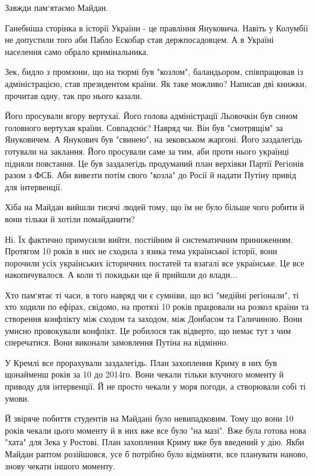 \begin{itemize}

Завжди пам`ятаємо Майдан.

Ганебніша сторінка в історії України - це правління Януковича. Навіть у
Колумбії не допустили того аби Пабло Ескобар став держпосадовцем. А в Україні
населення само обрало кримінальника.

Зек, бидло з промзони, що на тюрмі був "козлом", баландьором, співпрацював із
адміністрацією, став президентом країни. Як таке можливо? Написав дві книжки,
прочитав одну, так про нього казали.

Його просували вгору вертухаї. Його голова адміністрації Льовочкін був сином
головного вертухая країни. Совпадєніє? Навряд чи. Він був "смотрящім" за
Януковичем. А Янукович був "свинею", на зековськом жаргоні. Його заздалегідь
готували на заклання. Його просували саме за тим, аби проти нього українці
підняли повстання. Це був заздалегідь продуманий план верхівки Партії Регіонів
разом з ФСБ. Аби вивезти потім свого "козла" до Росії й надати Путіну привід
для інтервенції.

Хіба на Майдан вийшли тисячі людей тому, що їм не було більше чого робити й
вони тільки й хотіли помайданити?

Ні. Їх фактично примусили вийти, постійним й систематичним приниженням.
Протягом 10 років в них не сходила з язика тема української історії, вони
порочили усіх українських історичних постатей та взагалі все українське. Це все
накопичувалося. А коли ті покидьки ще й прийшли до влади...

Хто пам`ятає ті часи, в того навряд чи є сумніви, що всі "медійні регіонали",
ті хто ходили по ефірах, свідомо, на протязі 10 років працювали на розкол
країни та створення конфлікту між сходом та заходом, між Донбасом та Галичиною.
Вони умисно провокували конфлікт. Це робилося так відверто, що немає тут з чим
сперечатися. Вони виконали замовлення Путіна на відмінно.

У Кремлі все прорахували заздалегідь. План захоплення Криму в них був щонайменш
років за 10 до 2014го. Вони чекали тільки влучного моменту й приводу для
інтервенції. Й не просто чекали у моря погоди, а створювали собі ті умови.

Й звіряче побиття студентів на Майдані було невипадковим. Тому що вони 10 років
чекали цього моменту й в них вже все було "на мазі". Вже була готова нова
"хата" для Зека у Ростові. План захоплення Криму вже був введений у дію. Якби
Майдан раптом розійшовся, усе б потрібно було відміняти, все планувати наново,
знову чекати іншого моменту.


\end{itemize}
